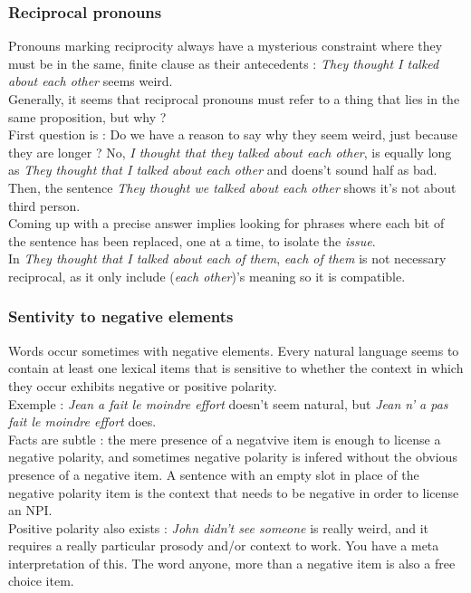 \documentclass{cours}
\begin{document}
\subsubsection{Reciprocal pronouns}
Pronouns marking reciprocity always have a mysterious constraint where they must be in the same, finite clause as their antecedents\! : \textsl{They thought I talked about each other} seems weird.\\
Generally, it seems that reciprocal pronouns must refer to a thing that lies in the same proposition, but why ? \\
First question is\! : Do we have a reason to say why they seem weird, just because they are longer ? No, \textsl{I thought that they talked about each other}, is equally long as \textsl{They thought that I talked about each other} and doens't sound half as bad. \\
Then, the sentence \textsl{They thought we talked about each other} shows it's not about third person. \\
Coming up with a precise answer implies looking for phrases where each bit of the sentence has been replaced, one at a time, to isolate the \textit{issue}.\\
In \textsl{They thought that I talked about each of them}, \textsl{each of them} is not necessary reciprocal, as it only include (\textsl{each other})'s meaning so it is compatible.

\subsubsection{Sentivity to negative elements}
Words occur sometimes with negative elements. Every natural language seems to contain at least one lexical items that is sensitive to whether the context in which they occur exhibits negative or positive polarity.\\
Exemple\! : \textsl{Jean a fait le moindre effort} doesn't seem natural, but \textsl{Jean \emph{n'} a \emph{pas} fait le moindre effort} does.\\
Facts are subtle\! : the mere presence of a negatvive item is enough to license a negative polarity, and sometimes negative polarity is infered without the obvious presence of a negative item. A sentence with an empty slot in place of the negative polarity item is the context that needs to be negative in order to license an NPI. \\
Positive polarity also exists\! : \textsl{John didn't see someone} is really weird, and it requires a really particular prosody and/or context to work. You have a meta interpretation of this. The word anyone, more than a negative item is also a free choice item.
\end{document}
